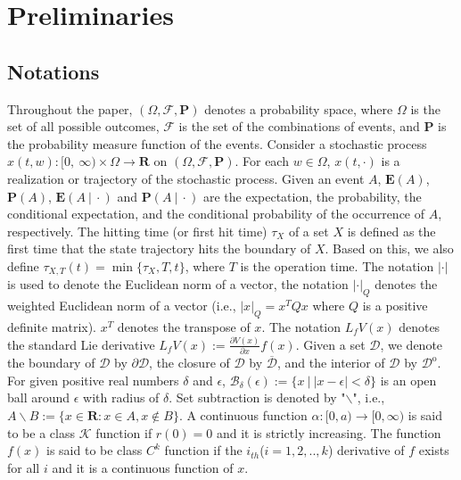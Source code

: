 \documentclass[letterpaper, 10pt, conference]{ieeeconf}
\begin{document}
%	
	
	\section{Preliminaries}
	\subsection{Notations}
	Throughout the paper, $(\Omega, \mathcal{F}, \mathbf{P})$ denotes a probability space, where $\Omega$ is the set of all possible outcomes, $\mathcal{F}$ is the set of the combinations of events, and $\mathbf{P}$ is the probability measure function of the events. Consider a stochastic process $x(t,w) : [0, ~\infty) \times \Omega \rightarrow  \mathbf{R}$ on $(\Omega, \mathcal{F}, \mathbf{P})$. For each $w \in \Omega$, $x(t,\cdot)$ is a realization or trajectory of the stochastic process. Given an event $A$, $\mathbf{E}(A)$, $\mathbf{P}(A)$, $\mathbf{E}(A ~|~ \cdot )$ and $\mathbf{P}(A ~|~ \cdot)$ are the expectation, the probability, the conditional expectation, and the conditional probability of the occurrence of $A$, respectively. The hitting time (or first hit time) $\tau_X$ of a set $X$ is defined as the first time that the state trajectory hits the boundary of $X$. Based on this, we also define $\tau_{X,T}(t)=\min\{ \tau_X,T,t\}$, where $T$ is the operation time. The notation $\left\vert \cdot \right\vert$ is used to denote the Euclidean norm of a vector, the notation $\left\vert \cdot \right\vert_{Q}$ denotes the weighted Euclidean norm of a vector (i.e., $\left\vert x \right\vert_Q = x^T Q x$ where $Q$ is a positive definite matrix). $x^T$ denotes the transpose of $x$. The notation $L_fV(x)$ denotes the standard Lie derivative $L_fV(x) :=\frac{\partial V(x)}{\partial x}f(x)$. Given a set $\mathcal{D}$, we denote the boundary of $\mathcal{D}$ by $\partial \mathcal{D}$, the closure of $\mathcal{D}$ by $\overline{\mathcal{D}}$, and the interior of $\mathcal{D}$ by $\mathcal{D}^{\text{o}}$. For given positive real numbers $\delta$ and $\epsilon$, $\mathcal{B}_{\delta}(\epsilon) := \{x ~|~ \vert x-\epsilon \vert < \delta \}$ is an open ball around $\epsilon$ with radius of $\delta$. Set subtraction is denoted by "$\backslash$", i.e., $A \backslash B := \{x \in \mathbf{R}: x \in A, x \notin B \}$. A continuous function $\alpha : [0,a)\rightarrow [0,\infty )$ is said to be a class $\mathcal {K}$ function if $r(0)=0$ and it is strictly increasing.	The function $f(x)$ is said to be class $C^k$ function if the $i_{th}$($i=1,2,..,k$) derivative of $f$ exists for all $i$ and it is a continuous function of $x$. %
	
\end{document}
